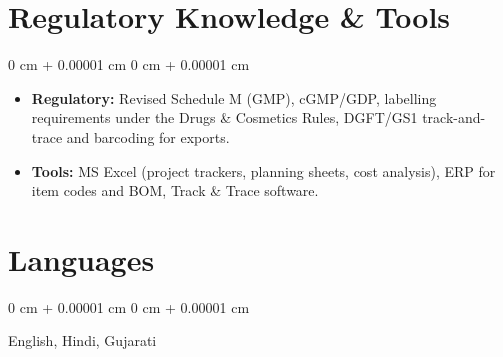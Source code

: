 \documentclass[10pt, letterpaper]{article}
\newenvironment{highlights}{
    \begin{itemize}[
        topsep=0.10 cm,
        parsep=0.10 cm,
        partopsep=0pt,
        itemsep=0pt,
        leftmargin=0 cm + 10pt
    ]
}{
    \end{itemize}
} %
\newenvironment{onecolentry}{
    \begin{adjustwidth}{
        0 cm + 0.00001 cm
    }{
        0 cm + 0.00001 cm
    }
}{
    \end{adjustwidth}
} %
\begin{document}
    \section{Regulatory Knowledge \& Tools}
        \begin{onecolentry}
            \begin{highlights}
                \item \textbf{Regulatory:} Revised Schedule M (GMP), cGMP/GDP, labelling requirements under the Drugs \& Cosmetics Rules, DGFT/GS1 track-and-trace and barcoding for exports.
                \item \textbf{Tools:} MS Excel (project trackers, planning sheets, cost analysis), ERP for item codes and BOM, Track \& Trace software.
            \end{highlights}
        \end{onecolentry}

    \section{Languages}
        \begin{onecolentry}
            English, Hindi, Gujarati
        \end{onecolentry}
\end{document}
